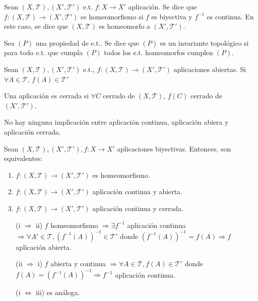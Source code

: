 \begin{defn}
  Sean $( X, \mathcal{T} ), ( X', \mathcal{T}' )$ e.t. $f: X \to X'$ aplicación. Se dice que $f: ( X, \mathcal{T} ) \to ( X', \mathcal{T}' )$ es homeomorfismo si $f$ es biyectiva y $ f^{-1}$ es continua. En este caso, se dice que $( X, \mathcal{T} )$ es homeomorfo a $( X', \mathcal{T}' )$.
\end{defn}

\begin{defn}
  Sea $(P)$ una propiedad de e.t.. Se dice que $(P)$ es un invariante topológico si para todo e.t. que cumpla $(P)$ todos los e.t. homeomorfos cumplen $(P)$.
\end{defn}

\begin{defn}
  Sean $( X, \mathcal{T} ), ( X', \mathcal{T}' )$ e.t., $f: ( X, \mathcal{T} ) \to ( X', \mathcal{T}' )$ aplicaciones abiertas. Si $\forall A \in \mathcal{T}$, $f(A) \in \mathcal{T}'$
\end{defn}

\begin{obs}
  Una aplicación es cerrada si $\forall C$ cerrado de $( X, \mathcal{T} )$, $f(C)$ cerrado de $( X', \mathcal{T}' )$.
\end{obs}

\begin{obs}
  No hay ninguna implicación entre aplicación continua, aplicación abiera y aplicación cerrada.
\end{obs}

\begin{prop}
  Sean $( X, \mathcal{T} ), ( X', \mathcal{T}' ), f: X \to X'$ aplicaciones biyectivas. Entonces, son equivalentes:
  \begin{enumerate}[label=(\roman*)]
    \item $f: ( X, \mathcal{T} ) \to ( X', \mathcal{T}' )$ es homeomorfismo.
    \item $f: ( X, \mathcal{T} ) \to ( X', \mathcal{T}' )$ aplicación continua y abierta.
    \item $f: ( X, \mathcal{T} ) \to ( X', \mathcal{T}' )$ aplicación continua y cerrada.
  \end{enumerate}
\end{prop}

\begin{dem}
  \begin{enumerate}[label=(\roman*)]
    \item []
    \item [(i $\Rightarrow$ ii)] $f$ homeomorfismo $\Rightarrow \exists f^{-1}$ aplicación continua $\Rightarrow \forall A' \in \mathcal{T}, (f^{-1}(A))^{-1} \in \mathcal{T}'$ donde $(f^{-1}(A))^{-1} = f(A) \Rightarrow f$ aplicación abierta.
    \item [(ii $\Rightarrow$ i)] $f$ abierta y continua $\Rightarrow \forall A \in \mathcal{T}, f(A) \in \mathcal{T}'$ donde $ f(A) = (f^{-1}(A))^{-1} \Rightarrow f^{-1}$ aplicación continua.
    \item [(i $ \Leftrightarrow$ iii)] es análoga.
  \end{enumerate}

\end{dem}

